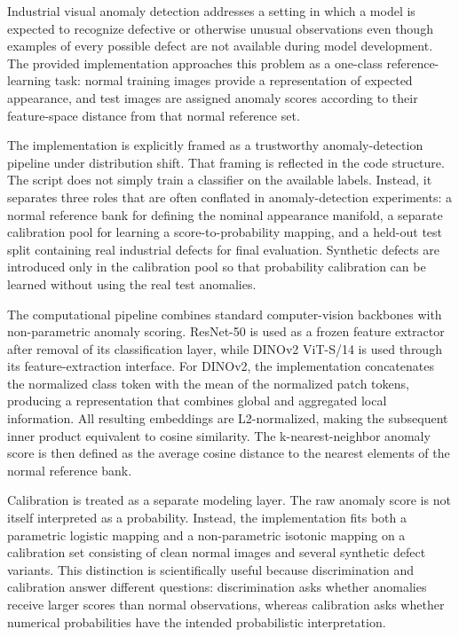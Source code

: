\documentclass[
  11pt,
]{article}
\begin{document}
Industrial visual anomaly detection addresses a setting in which a model
is expected to recognize defective or otherwise unusual observations
even though examples of every possible defect are not available during
model development. The provided implementation approaches this problem
as a one-class reference-learning task: normal training images provide a
representation of expected appearance, and test images are assigned
anomaly scores according to their feature-space distance from that
normal reference set.

The implementation is explicitly framed as a trustworthy
anomaly-detection pipeline under distribution shift. That framing is
reflected in the code structure. The script does not simply train a
classifier on the available labels. Instead, it separates three roles
that are often conflated in anomaly-detection experiments: a normal
reference bank for defining the nominal appearance manifold, a separate
calibration pool for learning a score-to-probability mapping, and a
held-out test split containing real industrial defects for final
evaluation. Synthetic defects are introduced only in the calibration
pool so that probability calibration can be learned without using the
real test anomalies.

The computational pipeline combines standard computer-vision backbones
with non-parametric anomaly scoring. ResNet-50 is used as a frozen
feature extractor after removal of its classification layer, while
DINOv2 ViT-S/14 is used through its feature-extraction interface. For
DINOv2, the implementation concatenates the normalized class token with
the mean of the normalized patch tokens, producing a representation that
combines global and aggregated local information. All resulting
embeddings are L2-normalized, making the subsequent inner product
equivalent to cosine similarity. The k-nearest-neighbor anomaly score is
then defined as the average cosine distance to the nearest elements of
the normal reference bank.

Calibration is treated as a separate modeling layer. The raw anomaly
score is not itself interpreted as a probability. Instead, the
implementation fits both a parametric logistic mapping and a
non-parametric isotonic mapping on a calibration set consisting of clean
normal images and several synthetic defect variants. This distinction is
scientifically useful because discrimination and calibration answer
different questions: discrimination asks whether anomalies receive
larger scores than normal observations, whereas calibration asks whether
numerical probabilities have the intended probabilistic interpretation.
\end{document}
